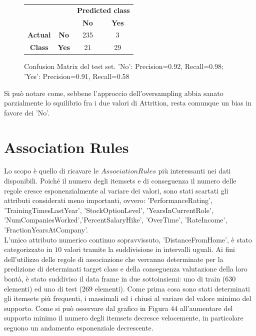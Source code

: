 \documentclass[a4paper,9pt]{article}
\begin{document}
\begin{figure}[H]
    \centering
\begin{tabular}{cc|cc}
\toprule
&\bfseries      & \multicolumn{2}{c}{\bfseries Predicted class} \\
& & \bfseries No & \bfseries Yes \\
\midrule
\bfseries Actual&\bfseries No  & 235 & 3  \\
\bfseries Class &\bfseries Yes & 21 & 29  \\
\bottomrule
\end{tabular}
\caption{Confusion Matrix del test set. 'No': Precision=0.92, Recall=0.98; 'Yes': Precision=0.91, Recall=0.58}
\end{figure}
Si può notare come, sebbene l'approccio dell'oversampling abbia sanato parzialmente lo squilibrio fra i due valori di Attrition, resta comunque un bias in favore dei 'No'.

\section{Association Rules}
Lo scopo è quello di ricavare le $Association Rules$ più interessanti nei dati disponibili. Poiché il numero degli itemsets e di conseguenza il numero delle regole cresce esponenzialmente al variare dei valori, sono stati scartati gli attributi considerati meno importanti, ovvero:
'PerformanceRating', 'TrainingTimesLastYear', 'StockOptionLevel',  'YearsInCurrentRole',  'NumCompaniesWorked','PercentSalaryHike',  'OverTime',  'RateIncome', 'FractionYearsAtCompany'.\\
L'unico attributo numerico continuo sopravvissuto, 'DistanceFromHome', è stato categorizzato in $10$ valori tramite la suddivisione in intervalli uguali.
Ai fini dell'utilizzo delle regole di associazione che verranno determinate per la predizione di determinati target class e della conseguenza valutazione della loro bontà, è stato suddiviso il data frame in due sottoinsiemi: uno di train ($630$ elementi) ed uno di test ($269$ elementi).
Come prima cosa sono stati determinati gli itemsets più frequenti, i massimali ed i chiusi al variare del valore minimo del supporto. Come si può osservare dal grafico in Figura $44$ all'aumentare del supporto minimo il numero degli itemsets decresce velocemente, in particolare seguono un andamento esponenziale decrescente.
\end{document}
